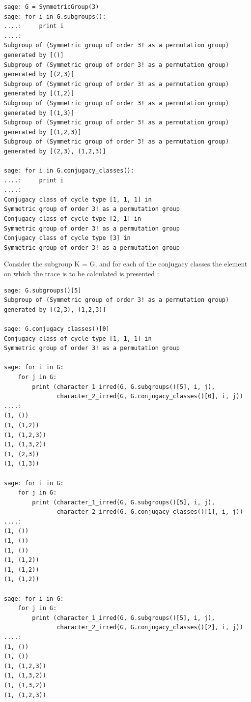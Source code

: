 \begin{lstlisting}[frame=single]
sage: G = SymmetricGroup(3)
sage: for i in G.subgroups():
....:     print i
....: 
Subgroup of (Symmetric group of order 3! as a permutation group) 
generated by [()]
Subgroup of (Symmetric group of order 3! as a permutation group) 
generated by [(2,3)]
Subgroup of (Symmetric group of order 3! as a permutation group) 
generated by [(1,2)]
Subgroup of (Symmetric group of order 3! as a permutation group) 
generated by [(1,3)]
Subgroup of (Symmetric group of order 3! as a permutation group) 
generated by [(1,2,3)]
Subgroup of (Symmetric group of order 3! as a permutation group) 
generated by [(2,3), (1,2,3)]

sage: for i in G.conjugacy_classes():
....:     print i
....: 
Conjugacy class of cycle type [1, 1, 1] in 
Symmetric group of order 3! as a permutation group
Conjugacy class of cycle type [2, 1] in 
Symmetric group of order 3! as a permutation group
Conjugacy class of cycle type [3] in 
Symmetric group of order 3! as a permutation group
\end{lstlisting}

    Consider the subgroup K = G, and for each of the conjugacy classes the element on which the trace is to be calculated is presented :

\begin{lstlisting}[frame=single]
sage: G.subgroups()[5]
Subgroup of (Symmetric group of order 3! as a permutation group) 
generated by [(2,3), (1,2,3)]

sage: G.conjugacy_classes()[0]
Conjugacy class of cycle type [1, 1, 1] in 
Symmetric group of order 3! as a permutation group

sage: for i in G:
    for j in G:
        print (character_1_irred(G, G.subgroups()[5], i, j), 
               character_2_irred(G, G.conjugacy_classes()[0], i, j))
....: 
(1, ())
(1, (1,2))
(1, (1,2,3))
(1, (1,3,2))
(1, (2,3))
(1, (1,3))

sage: for i in G:
    for j in G:
        print (character_1_irred(G, G.subgroups()[5], i, j), 
               character_2_irred(G, G.conjugacy_classes()[1], i, j))
....: 
(1, ())
(1, ())
(1, ())
(1, (1,2))
(1, (1,2))
(1, (1,2))

sage: for i in G:
    for j in G:
        print (character_1_irred(G, G.subgroups()[5], i, j), 
               character_2_irred(G, G.conjugacy_classes()[2], i, j))
....: 
(1, ())
(1, ())
(1, (1,2,3))
(1, (1,3,2))
(1, (1,3,2))
(1, (1,2,3))
\end{lstlisting}

